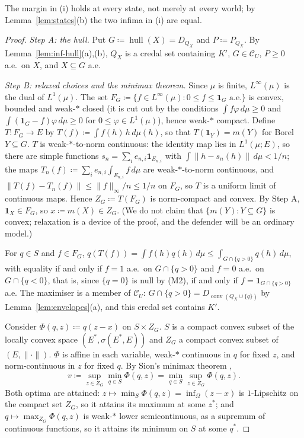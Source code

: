 \documentclass[11pt]{article}
\newcommand{\one}{\mathbf{1}}
\newcommand{\CC}{\mathcal{C}}
\newcommand{\hull}{\operatorname{hull}}
\DeclareMathOperator{\conv}{conv}
\theoremstyle{plain}
\theoremstyle{definition}
\theoremstyle{remark}
\begin{document}
The margin in (i) holds at every state, not merely at every world; by
Lemma~\ref{lem:states}(b) the two infima in (i) are equal.

\begin{proof}
\emph{Step A: the hull.} Put $G\coloneqq\hull(X)=D_{Q_X}$ and $P\coloneqq P_{Q_X}$. By
Lemma~\ref{lem:inf-hull}(a),(b), $Q_X$ is a credal set containing $K'$, $G\in\CC_U$, $P\ge0$
a.e.\ on $X$, and $X\subseteq G$ a.e.

\emph{Step B: relaxed choices and the minimax theorem.} Since $\mu$ is finite,
$L^\infty(\mu)$ is the dual of $L^1(\mu)$. The set $F_G\coloneqq\{f\in L^\infty(\mu):0\le
f\le\one_G\text{ a.e.}\}$ is convex, bounded and weak-$\ast$ closed (it is cut out by the
conditions $\int f\varphi\,d\mu\ge0$ and $\int(\one_G-f)\varphi\,d\mu\ge0$ for $0\le
\varphi\in L^1(\mu)$), hence weak-$\ast$ compact. Define $T:F_G\to E$ by $T(f)\coloneqq\int
f(h)\,h\,d\mu(h)$, so that $T(\one_Y)=m(Y)$ for Borel $Y\subseteq G$. $T$ is
weak-$\ast$-to-norm continuous: the identity map lies in $L^1(\mu;E)$, so there are simple
functions $s_n=\sum_ie_{n,i}\one_{E_{n,i}}$ with $\int\|h-s_n(h)\|\,d\mu<1/n$; the maps
$T_n(f)\coloneqq\sum_ie_{n,i}\int_{E_{n,i}}f\,d\mu$ are weak-$\ast$-to-norm continuous,
and $\|T(f)-T_n(f)\|\le\|f\|_\infty/n\le1/n$ on $F_G$, so $T$ is a uniform limit of
continuous maps. Hence $Z_G\coloneqq T(F_G)$ is norm-compact and convex. By Step A,
$\one_X\in F_G$, so $x\coloneqq m(X)\in Z_G$. (We do not claim that $\{m(Y):Y\subseteq G\}$
is convex; relaxation is a device of the proof, and the defender will be an ordinary
model.)

For $q\in S$ and $f\in F_G$, $q(T(f))=\int f(h)q(h)\,d\mu\le\int_{G\cap\{q>0\}}q(h)\,d\mu$,
with equality if and only if $f=1$ a.e.\ on $G\cap\{q>0\}$ and $f=0$ a.e.\ on $G\cap\{q<0\}$,
that is, since $\{q=0\}$ is null by (M2), if and only if $f=\one_{G\cap\{q>0\}}$ a.e. The
maximiser is a member of $\CC_U$: $G\cap\{q>0\}=D_{\conv(Q_X\cup\{q\})}$ by
Lemma~\ref{lem:envelopes}(a), and this credal set contains $K'$.

Consider $\Phi(q,z)\coloneqq q(z-x)$ on $S\times Z_G$. $S$ is a compact convex subset of
the locally convex space $(E^\ast,\sigma(E^\ast,E))$ and $Z_G$ a compact convex subset of
$(E,\|\cdot\|)$. $\Phi$ is affine in each variable, weak-$\ast$ continuous in $q$ for fixed
$z$, and norm-continuous in $z$ for fixed $q$. By Sion's minimax theorem \cite{Sion},
\[
  v\coloneqq\sup_{z\in Z_G}\min_{q\in S}\Phi(q,z)=\min_{q\in S}\sup_{z\in Z_G}\Phi(q,z).
\]
Both optima are attained: $z\mapsto\min_S\Phi(q,z)=\inf_\Omega(z-x)$ is $1$-Lipschitz on
the compact set $Z_G$, so it attains its maximum at some $z^\ast$; and $q\mapsto\max_{Z_G}
\Phi(q,z)$ is weak-$\ast$ lower semicontinuous, as a supremum of continuous functions, so
it attains its minimum on $S$ at some $q^\ast$.


\end{proof}
\end{document}
